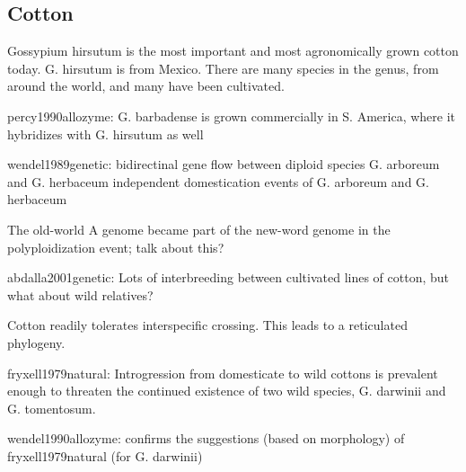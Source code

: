 \documentclass[11pt]{article}
\begin{document}
\subsection*{Cotton}

Gossypium hirsutum is the most important and most agronomically grown cotton today.
G. hirsutum is from Mexico.
There are many species in the genus, from around the world, and many have been cultivated.

percy1990allozyme:
G. barbadense is grown commercially in S. America, where it hybridizes with G. hirsutum as well

wendel1989genetic:
bidirectinal gene flow between diploid species G. arboreum and G. herbaceum
independent domestication events of G. arboreum and G. herbaceum

The old-world A genome became part of the new-word genome in the polyploidization event; talk about this?

abdalla2001genetic:
Lots of interbreeding between cultivated lines of cotton, but what about wild relatives?

Cotton readily tolerates interspecific crossing.
This leads to a reticulated phylogeny.

fryxell1979natural:
Introgression from domesticate to wild cottons is prevalent enough to threaten the continued existence of two wild species, G. darwinii and G. tomentosum.

wendel1990allozyme:
confirms the suggestions (based on morphology) of fryxell1979natural (for G. darwinii)











\end{document}
